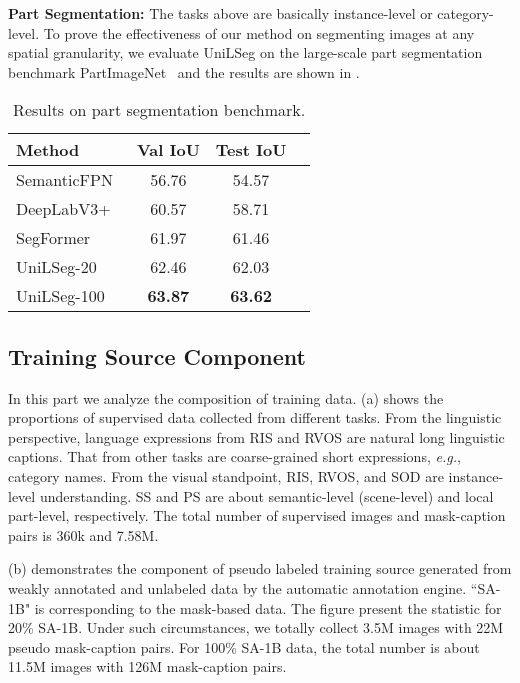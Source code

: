 \documentclass[10pt,twocolumn,letterpaper]{article}
\newcommand{\MethodName}{UniLSeg\xspace}
\begin{document}
\vspace{5pt}
\noindent \textbf{Part Segmentation:}
The tasks above are basically instance-level or category-level. To prove the effectiveness of our method on segmenting images at any spatial granularity, we evaluate \MethodName on the large-scale part segmentation benchmark PartImageNet~\cite{partimagenet} and the results are shown in .
\begin{table}
    \centering
    \small
    \renewcommand\arraystretch{1.1}
    \caption{Results on part segmentation benchmark.}
    \setlength\tabcolsep{18.2pt}
    \label{tab:ps}
    \begin{tabular}{lccc}
    \hline
    Method  &Val IoU & Test IoU   \\
    \hline
       SemanticFPN~\cite{pfpn} &56.76 & 54.57 \\
       DeepLabV3+~\cite{deeplabv3}  &60.57 & 58.71   \\
       SegFormer~\cite{seggpt} &61.97 & 61.46  \\
       \hline
       \MethodName-20 &62.46 &62.03 \\
       \MethodName-100 &\textbf{63.87} &\textbf{63.62} \\
       \hline
    \end{tabular}
\end{table} 

\subsection{Training Source Component}


In this part we analyze the composition of training data.
 (a) shows the proportions of supervised data collected from different tasks. 
From the linguistic perspective, language expressions from RIS and RVOS are natural long linguistic captions. That from other tasks are coarse-grained short expressions, \textit{e.g.}, category names. 
From the visual standpoint, RIS, RVOS, and SOD are instance-level understanding. SS and PS are about semantic-level (scene-level) and local part-level, respectively.
The total number of supervised images and mask-caption pairs is 360k and 7.58M.

 (b) demonstrates the component of pseudo labeled training source generated from weakly annotated and unlabeled data by the automatic annotation engine. ``SA-1B" is corresponding to the mask-based data. The figure present the statistic for 20\% SA-1B. Under such circumstances, we totally collect 3.5M images with 22M pseudo mask-caption pairs. For 100\%  SA-1B data, the total number is about 11.5M images with 126M mask-caption pairs.
\end{document}
